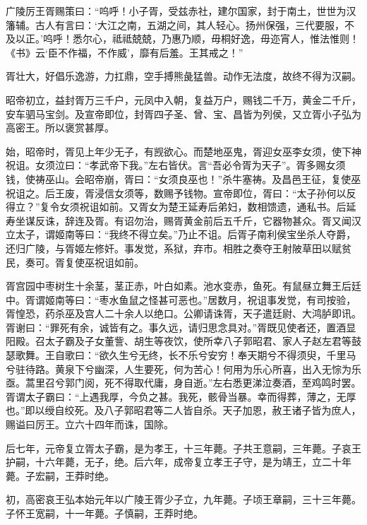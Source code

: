 \documentclass[12pt,UTF8]{ctexbook}
\begin{document}
广陵厉王胥赐策曰：“呜呼！小子胥，受兹赤社，建尔国家，封于南土，世世为汉籓辅。古人有言曰：‘大江之南，五湖之间，其人轻心。扬州保强，三代要服，不及以正。’呜呼！悉尔心，祗祗兢兢，乃惠乃顺，毋桐好逸，毋迩宵人，惟法惟则！《书》云‘臣不作福，不作威’，靡有后羞。王其戒之！”



胥壮大，好倡乐逸游，力扛鼎，空手搏熊彘猛兽。动作无法度，故终不得为汉嗣。



昭帝初立，益封胥万三千户，元凤中入朝，复益万户，赐钱二千万，黄金二千斤，安车驷马宝剑。及宣帝即位，封胥四子圣、曾、宝、昌皆为列侯，又立胥小子弘为高密王。所以褒赏甚厚。



始，昭帝时，胥见上年少无子，有觊欲心。而楚地巫鬼，胥迎女巫李女须，使下神祝诅。女须泣曰：“孝武帝下我。”左右皆伏。言“吾必令胥为天子”。胥多赐女须钱，使祷巫山。会昭帝崩，胥曰：“女须良巫也！”杀牛塞祷。及昌邑王征，复使巫祝诅之。后王废，胥浸信女须等，数赐予钱物。宣帝即位，胥曰：“太子孙何以反得立？”复令女须祝诅如前。又胥女为楚王延寿后弟妇，数相馈遗，通私书。后延寿坐谋反诛，辞连及胥。有诏勿治，赐胥黄金前后五千斤，它器物甚众。胥又闻汉立太子，谓姬南等曰：“我终不得立矣。”乃止不诅。后胥子南利侯宝坐杀人夺爵，还归广陵，与胥姬左修奸。事发觉，系狱，弃市。相胜之奏夺王射陂草田以赋贫民，奏可。胥复使巫祝诅如前。



胥宫园中枣树生十余茎，茎正赤，叶白如素。池水变赤，鱼死。有鼠昼立舞王后廷中。胥谓姬南等曰：“枣水鱼鼠之怪甚可恶也。”居数月，祝诅事发觉，有司按验，胥惶恐，药杀巫及宫人二十余人以绝口。公卿请诛胥，天子遣廷尉、大鸿胪即讯。胥谢曰：“罪死有余，诚皆有之。事久远，请归思念具对。”胥既见使者还，置酒显阳殿。召太子霸及子女董訾、胡生等夜饮，使所幸八子郭昭君、家人子赵左君等鼓瑟歌舞。王自歌曰：“欲久生兮无终，长不乐兮安穷！奉天期兮不得须臾，千里马兮驻待路。黄泉下兮幽深，人生要死，何为苦心！何用为乐心所喜，出入无悰为乐亟。蒿里召兮郭门阅，死不得取代庸，身自逝。”左右悉更涕泣奏酒，至鸡鸣时罢。胥谓太子霸曰：“上遇我厚，今负之甚。我死，骸骨当暴。幸而得葬，薄之，无厚也。”即以绶自绞死。及八子郭昭君等二人皆自杀。天子加恩，赦王诸子皆为庶人，赐谥曰厉王。立六十四年而诛，国除。



后七年，元帝复立胥太子霸，是为孝王，十三年薨。子共王意嗣，三年薨。子哀王护嗣，十六年薨，无子，绝。后六年，成帝复立孝王子守，是为靖王，立二十年薨。子宏嗣，王莽时绝。



初，高密哀王弘本始元年以广陵王胥少子立，九年薨。子顷王章嗣，三十三年薨。子怀王宽嗣，十一年薨。子慎嗣，王莽时绝。
\end{document}
